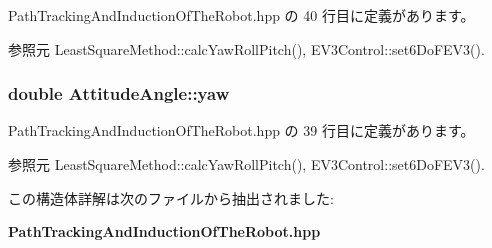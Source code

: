  Path\-Tracking\-And\-Induction\-Of\-The\-Robot.\-hpp の 40 行目に定義があります。



参照元 Least\-Square\-Method\-::calc\-Yaw\-Roll\-Pitch(), E\-V3\-Control\-::set6\-Do\-F\-E\-V3().

\subsubsection[{yaw}]{\setlength{\rightskip}{0pt plus 5cm}double Attitude\-Angle\-::yaw}\label{struct_attitude_angle_a9a2b52b89e0f763cef36b623962ff998}


 Path\-Tracking\-And\-Induction\-Of\-The\-Robot.\-hpp の 39 行目に定義があります。



参照元 Least\-Square\-Method\-::calc\-Yaw\-Roll\-Pitch(), E\-V3\-Control\-::set6\-Do\-F\-E\-V3().



この構造体詳解は次のファイルから抽出されました\-:\begin{DoxyCompactItemize}
\item 
{\bf Path\-Tracking\-And\-Induction\-Of\-The\-Robot.\-hpp}\end{DoxyCompactItemize}
